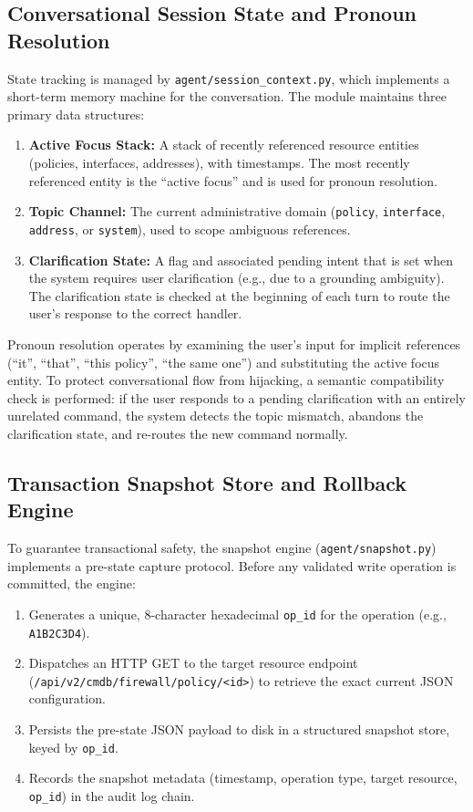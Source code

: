 \subsection{Conversational Session State and Pronoun Resolution}
\label{subsec:session}

State tracking is managed by \texttt{agent/session\_context.py}, which implements a short-term memory machine for the conversation. The module maintains three primary data structures:

\begin{enumerate}
    \item \textbf{Active Focus Stack:} A stack of recently referenced resource entities (policies, interfaces, addresses), with timestamps. The most recently referenced entity is the ``active focus'' and is used for pronoun resolution.
    \item \textbf{Topic Channel:} The current administrative domain (\texttt{policy}, \texttt{interface}, \texttt{address}, or \texttt{system}), used to scope ambiguous references.
    \item \textbf{Clarification State:} A flag and associated pending intent that is set when the system requires user clarification (e.g., due to a grounding ambiguity). The clarification state is checked at the beginning of each turn to route the user's response to the correct handler.
\end{enumerate}

Pronoun resolution operates by examining the user's input for implicit references (``it'', ``that'', ``this policy'', ``the same one'') and substituting the active focus entity. To protect conversational flow from hijacking, a semantic compatibility check is performed: if the user responds to a pending clarification with an entirely unrelated command, the system detects the topic mismatch, abandons the clarification state, and re-routes the new command normally.

\subsection{Transaction Snapshot Store and Rollback Engine}
\label{subsec:snapshot}

To guarantee transactional safety, the snapshot engine (\texttt{agent/snapshot.py}) implements a pre-state capture protocol. Before any validated write operation is committed, the engine:

\begin{enumerate}
    \item Generates a unique, 8-character hexadecimal \texttt{op\_id} for the operation (e.g., \texttt{A1B2C3D4}).
    \item Dispatches an HTTP GET to the target resource endpoint
    (\texttt{/api/v2/cmdb/firewall/\allowbreak{}policy/<id>}) to
    retrieve the exact current JSON configuration.
    \item Persists the pre-state JSON payload to disk in a structured snapshot store, keyed by \texttt{op\_id}.
    \item Records the snapshot metadata (timestamp, operation type, target resource, \texttt{op\_id}) in the audit log chain.
\end{enumerate}

